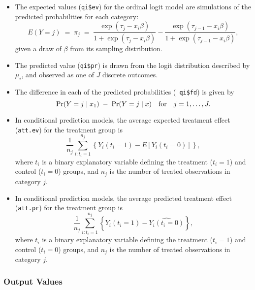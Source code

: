 \documentclass{article}
\begin{document}
\begin{itemize}
\item The expected values ({\tt qi\$ev}) for the ordinal logit model
  are simulations of the predicted probabilities for each category: 
\begin{equation*}
E(Y = j) \; = \; \pi_{j} \; = \; \frac{\exp(\tau_j - x_i \beta)}
{1 + \exp(\tau_j - x_i \beta)} - \frac{\exp(\tau_{j-1} - x_i \beta)}{1 +
 \exp(\tau_{j-1} - x_i \beta)},
\end{equation*}
given a draw of $\beta$ from its sampling distribution.  

\item The predicted value ({\tt qi\$pr}) is drawn from the logit
  distribution described by $\mu_i$, and observed as one of $J$
  discrete outcomes.  

\item The difference in each of the predicted probabilities ({\tt
    qi\$fd}) is given by
  \begin{equation*}
    \Pr(Y=j \mid x_1) \;-\; \Pr(Y=j \mid x) \quad {\rm for} \quad
    j=1,\dots,J.
  \end{equation*}

\item In conditional prediction models, the average expected treatment
  effect ({\tt att.ev}) for the treatment group is 
    \begin{equation*} \frac{1}{n_j}\sum_{i:t_i=1}^{n_j} \left\{ Y_i(t_i=1) -
      E[Y_i(t_i=0)] \right\},
    \end{equation*} 
where $t_{i}$ is a binary explanatory variable defining the treatment
($t_{i}=1$) and control ($t_{i}=0$) groups, and $n_j$ is the 
number of treated observations in category $j$.

\item In conditional prediction models, the average predicted treatment
  effect ({\tt att.pr}) for the treatment group is 
    \begin{equation*} \frac{1}{n_j}\sum_{i:t_i=1}^{n_j} \left\{ Y_i(t_i=1) -
      \widehat{Y_i(t_i=0)} \right\},
    \end{equation*} 
where $t_{i}$ is a binary explanatory variable defining the treatment
($t_{i}=1$) and control ($t_{i}=0$) groups, and $n_j$ is the 
number of treated observations in category $j$.

\end{itemize}

\subsubsection{Output Values}
\end{document}
